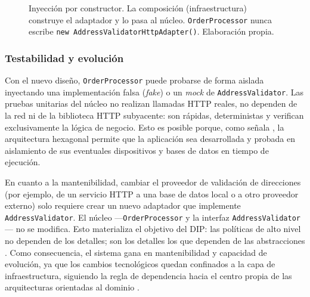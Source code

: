 \begin{figure}[H]
  \centering
  \caption{Inyección por constructor. La composición (infraestructura) construye el adaptador y lo pasa al núcleo. \texttt{OrderProcessor} nunca escribe \texttt{new AddressValidatorHttpAdapter()}. Elaboración propia.}
  \label{fig:inyeccion}
\end{figure}

\subsubsection{Testabilidad y evolución}
Con el nuevo diseño, \texttt{OrderProcessor} puede probarse de forma aislada inyectando una implementación falsa (\emph{fake}) o un \emph{mock} de \texttt{AddressValidator}. Las pruebas unitarias del núcleo no realizan llamadas HTTP reales, no dependen de la red ni de la biblioteca HTTP subyacente: son rápidas, deterministas y verifican exclusivamente la lógica de negocio. Esto es posible porque, como señala \textcite{cockburn2005hexagonal}, la arquitectura hexagonal permite que la aplicación sea desarrollada y probada en aislamiento de sus eventuales dispositivos y bases de datos en tiempo de ejecución.

En cuanto a la mantenibilidad, cambiar el proveedor de validación de direcciones (por ejemplo, de un servicio HTTP a una base de datos local o a otro proveedor externo) solo requiere crear un nuevo adaptador que implemente \texttt{AddressValidator}. El núcleo ---\texttt{OrderProcessor} y la interfaz \texttt{AddressValidator}--- no se modifica. Esto materializa el objetivo del DIP: las políticas de alto nivel no dependen de los detalles; son los detalles los que dependen de las abstracciones \parencite{martin2017clean}. Como consecuencia, el sistema gana en mantenibilidad y capacidad de evolución, ya que los cambios tecnológicos quedan confinados a la capa de infraestructura, siguiendo la regla de dependencia hacia el centro propia de las arquitecturas orientadas al dominio \parencite{palermo2008onion}.

